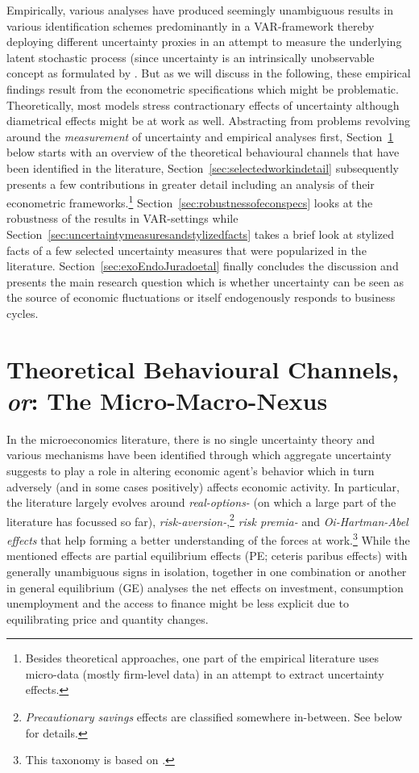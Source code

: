 \documentclass[a4paper,11pt,listof=nochaptergap,oneside,pointednumbers,bibtotoc,bigheadings,liststotoc]{scrbook}
\theoremstyle{mysatz}
\theoremstyle{mydefinition}
\theoremstyle{mytheorem}
\theoremstyle{mybemerkung}
\begin{document}
Empirically, various analyses have produced seemingly unambiguous results in various identification schemes predominantly in a VAR-framework thereby deploying different uncertainty proxies in an attempt to measure the underlying latent stochastic process (since uncertainty is an intrinsically unobservable concept as formulated by \citep{bloom:14}. But as we will discuss in the following, these empirical findings result from the econometric specifications which might be problematic. Theoretically, most models stress contractionary effects of uncertainty although diametrical effects might be at work as well. Abstracting from problems revolving around the \textit{measurement} of uncertainty and empirical analyses first, Section~\ref{sec:studiedeffectsinrelatedliterature} below starts with an overview of the theoretical behavioural channels that have been identified in the literature, Section~\ref{sec:selectedworkindetail} subsequently presents a few contributions in greater detail including an analysis of their econometric frameworks.\footnote{Besides theoretical approaches, one part of the empirical literature uses micro-data (mostly firm-level data) in an attempt to extract uncertainty effects.} Section~\ref{sec:robustnessofeconspecs} looks at the robustness of the results in VAR-settings while Section~\ref{sec:uncertaintymeasuresandstylizedfacts} takes a brief look at stylized facts of a few selected uncertainty measures that were popularized in the literature. Section~\ref{sec:exoEndoJuradoetal} finally concludes the discussion and presents the main research question which is whether uncertainty can be seen as the source of economic fluctuations or itself endogenously responds to business cycles.


\section[Theoretical Behavioural Channels, \textit{or}: The Micro-Macro-Nexus]{Theoretical Behavioural Channels, \textit{or}: The Micro-Macro-Nexus}
\label{sec:studiedeffectsinrelatedliterature}

In the microeconomics literature, there is no single uncertainty theory and various mechanisms have been identified through which aggregate uncertainty suggests to play a role in altering economic agent's behavior which in turn adversely (and in some cases positively) affects economic activity. In particular, the literature largely evolves around \textit{real-options-} (on which a large part of the literature has focussed so far), \textit{risk-aversion-},\footnote{\textit{Precautionary savings} effects are classified somewhere in-between. See below for details.} \textit{risk premia-} and \textit{Oi-Hartman-Abel effects} that help forming a better understanding of the forces at work.\footnote{This taxonomy is based on \citet{bloom:14}.} While the mentioned effects are partial equilibrium effects (PE; ceteris paribus effects) with generally unambiguous signs in isolation, together in one combination or another in general equilibrium (GE) analyses the net effects on investment, consumption unemployment and the access to finance might be less explicit due to equilibrating price and quantity changes.\\
\end{document}
